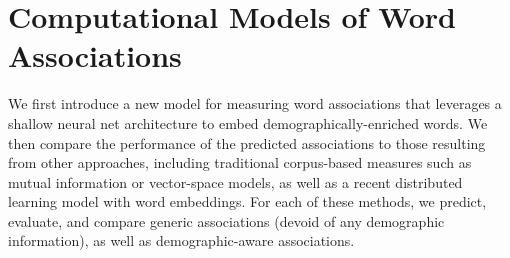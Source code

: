 \documentclass[11pt,letterpaper]{article}
\begin{document}
\begin{comment}
\begin{table}[ht]
\centering
\scalebox{0.95}{
\renewcommand{\arraystretch}{1}
\begin{tabular}{p{1cm}|c|c|c||c|c|c}
\hline
 Demo- & \multicolumn{3}{c||}{Standard} & \multicolumn{3}{c}{All}\\   
\cline{2-4} \cline{5-7}
graphic & 1 & 2 & 3 & 1 & 2 & 3\\
\hline
\hline
India & 0.24 & 0.12 & 0.08 & 0.19 & 0.10 & 0.07 \\
 US & 0.30 & 0.12 & 0.08 & 0.26 & 0.12 & 0.08\\
 Male & 0.25 & 0.11 & 0.08 & 0.21 & 0.10 & 0.08 \\
 Female & 0.26 & 0.12 & 0.08 & 0.22 & 0.11 & 0.08\\
\hline 
\end{tabular}
}
\caption{Percentage of users with the most popular, second most popular, and third most popular responses, averaged across the 100 standard stimulus words and all the 286 stimulus words.}
\label{tab:popularResponses}
\end{table}
\end{comment}


\section{Computational Models of Word Associations}
\label{models}
We first introduce a new model for measuring word associations that  leverages a shallow neural net architecture to embed demographically-enriched words. We then compare the performance of the predicted associations to those resulting from other approaches, including traditional corpus-based measures such as mutual information or vector-space models, as well as a recent distributed learning model with word embeddings. For each of these methods, we predict, evaluate, and compare generic associations (devoid of any demographic information), as well as demographic-aware associations.

\end{document}
